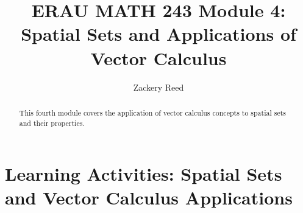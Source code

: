 \documentclass{xourse}
\title{ERAU MATH 243 Module 4: Spatial Sets and Applications of Vector Calculus}
\author{Zackery Reed}
\begin{document}
\begin{abstract}
This fourth module covers the application of vector calculus concepts to spatial sets and their properties.
\end{abstract}
\maketitle

\part{Learning Activities: Spatial Sets and Vector Calculus Applications}
\sectionstyle

\end{document}
